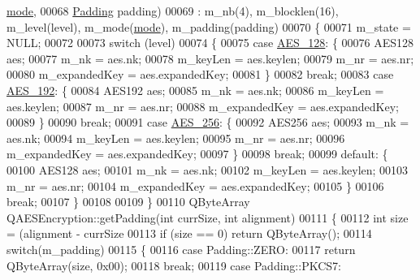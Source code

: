 \begin{DoxyCode}
      \mbox{\hyperlink{namespacetests-setup_a04126d10edec6b3171e1b55a00309b23}{mode}},
00068                                \mbox{\hyperlink{class_q_a_e_s_encryption_ab0a65cdea4eac21ef32530010d1b0247}{Padding}} padding)
00069     : m\_nb(4), m\_blocklen(16), m\_level(level), m\_mode(\mbox{\hyperlink{namespacetests-setup_a04126d10edec6b3171e1b55a00309b23}{mode}}), m\_padding(padding)
00070 \{
00071     m\_state = NULL;
00072 
00073     \textcolor{keywordflow}{switch} (level)
00074     \{
00075     \textcolor{keywordflow}{case} \mbox{\hyperlink{class_q_a_e_s_encryption_abe48208f4f6c7d68e6a10b49b9d0b7bda0fa01cdf69e5537499ecfc6f96d6570a}{AES\_128}}: \{
00076         AES128 aes;
00077         m\_nk = aes.nk;
00078         m\_keyLen = aes.keylen;
00079         m\_nr = aes.nr;
00080         m\_expandedKey = aes.expandedKey;
00081         \}
00082         \textcolor{keywordflow}{break};
00083     \textcolor{keywordflow}{case} \mbox{\hyperlink{class_q_a_e_s_encryption_abe48208f4f6c7d68e6a10b49b9d0b7bda7bd082b240582de6d5f4b8ea604e646b}{AES\_192}}: \{
00084         AES192 aes;
00085         m\_nk = aes.nk;
00086         m\_keyLen = aes.keylen;
00087         m\_nr = aes.nr;
00088         m\_expandedKey = aes.expandedKey;
00089         \}
00090         \textcolor{keywordflow}{break};
00091     \textcolor{keywordflow}{case} \mbox{\hyperlink{class_q_a_e_s_encryption_abe48208f4f6c7d68e6a10b49b9d0b7bdacde97774ab1d4c609e04b0dd13a1e1f7}{AES\_256}}: \{
00092         AES256 aes;
00093         m\_nk = aes.nk;
00094         m\_keyLen = aes.keylen;
00095         m\_nr = aes.nr;
00096         m\_expandedKey = aes.expandedKey;
00097         \}
00098         \textcolor{keywordflow}{break};
00099     \textcolor{keywordflow}{default}: \{
00100         AES128 aes;
00101         m\_nk = aes.nk;
00102         m\_keyLen = aes.keylen;
00103         m\_nr = aes.nr;
00104         m\_expandedKey = aes.expandedKey;
00105         \}
00106         \textcolor{keywordflow}{break};
00107     \}
00108 
00109 \}
00110 QByteArray QAESEncryption::getPadding(\textcolor{keywordtype}{int} currSize, \textcolor{keywordtype}{int} alignment)
00111 \{
00112     \textcolor{keywordtype}{int} size = (alignment - currSize %
00113     \textcolor{keywordflow}{if} (size == 0) \textcolor{keywordflow}{return} QByteArray();
00114     \textcolor{keywordflow}{switch}(m\_padding)
00115     \{
00116     \textcolor{keywordflow}{case} Padding::ZERO:
00117         \textcolor{keywordflow}{return} QByteArray(size, 0x00);
00118         \textcolor{keywordflow}{break};
00119     \textcolor{keywordflow}{case} Padding::PKCS7:

\end{DoxyCode}
